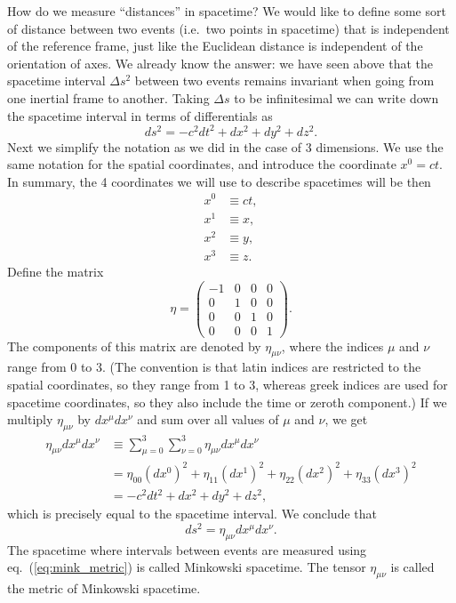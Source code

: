 \documentclass[11pt, a4paper,oneside,openright]{book}
\numberwithin{equation}{section}
\begin{document}
How do we measure ``distances'' in spacetime? We would like to define some sort of distance between two events (i.e.\ two points in spacetime) that is independent of the reference frame, just like the Euclidean distance is independent of the orientation of axes. We already know the answer: we have seen above that the spacetime interval $\Delta s^2$ between two events remains invariant when going from one inertial frame to another. Taking $\Delta s$ to be infinitesimal we can write down the spacetime interval in terms of differentials as
\begin{equation}
ds^2=-c^2dt^2+dx^2+dy^2+dz^2.
\end{equation}
Next we simplify the notation as we did in the case of 3 dimensions. We use the same notation for the spatial coordinates, and introduce the coordinate $x^0=ct$. In summary, the 4 coordinates we will use to describe spacetimes will be then
\begin{equation}
\begin{split}
x^0&\equiv ct,\\
x^1&\equiv x,\\
x^2&\equiv y,\\
x^3&\equiv z.
\end{split}
\end{equation}
Define the matrix
\begin{equation}
\label{etamunu}
\eta=\left( \begin{array}{cccc} -1 & 0 & 0 & 0 \\ 
0 & 1 & 0 & 0 \\
0 & 0 & 1 & 0 \\
0 & 0 & 0 & 1\end{array} \right).
\end{equation}
The components of this matrix are denoted by $\eta_{\mu\nu}$, where the indices $\mu$ and $\nu$ range from $0$ to $3$. (The convention is that latin indices are restricted to the spatial coordinates, so they range from 1 to 3, whereas greek indices are used for spacetime coordinates, so they also include the time or zeroth component.) If we multiply $\eta_{\mu\nu}$ by $dx^{\mu}dx^{\nu}$ and sum over all values of $\mu$ and $\nu$, we get
\begin{equation}
\begin{split}
\eta_{\mu\nu}dx^{\mu}dx^{\nu}&\equiv \sum_{\mu=0}^3\sum_{\nu=0}^3 \eta_{\mu\nu}dx^{\mu}dx^{\nu}\\
&=\eta_{00}(dx^0)^2+\eta_{11}(dx^1)^2+\eta_{22}(dx^2)^2+\eta_{33}(dx^3)^2\\
&=-c^2dt^2+dx^2+dy^2+dz^2,
\end{split}
\end{equation}
which is precisely equal to the spacetime interval. We conclude that
\begin{equation} \label{eq:mink_metric}
ds^2=\eta_{\mu\nu}dx^{\mu}dx^{\nu}.
\end{equation}
The spacetime where intervals between events are measured using eq.\ (\ref{eq:mink_metric}) is called Minkowski spacetime. The tensor $\eta_{\mu\nu}$ is called the metric of Minkowski spacetime.
\end{document}
